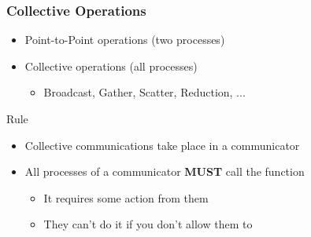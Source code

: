 \documentclass[xcolor={x11names,svgnames,psnames}]{beamer}
\begin{document}
\begin{frame}
  \frametitle{Collective Operations}

  \begin{itemize}
  \item Point-to-Point operations (two processes) 
  \item Collective operations (\alert{all} processes)
    \begin{itemize}
    \item Broadcast, Gather, Scatter, Reduction, ...
    \end{itemize}
  \end{itemize}

  \bigskip
  
  \begin{block}{Rule}
    \begin{itemize}
    \item Collective communications take place in a communicator
    \item All processes of a communicator \textbf{MUST} call the function
      \begin{itemize}
      \item It requires some action from them
      \item They can't do it if you don't allow them to
      \end{itemize}
    \end{itemize}
  \end{block}
\end{frame}

\end{document}
